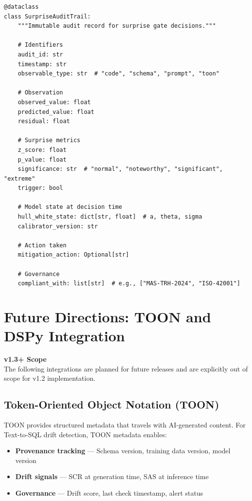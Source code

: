 \begin{lstlisting}[language=jsonx,caption={Surprise audit trail schema}]
@dataclass
class SurpriseAuditTrail:
    """Immutable audit record for surprise gate decisions."""
    
    # Identifiers
    audit_id: str
    timestamp: str
    observable_type: str  # "code", "schema", "prompt", "toon"
    
    # Observation
    observed_value: float
    predicted_value: float
    residual: float
    
    # Surprise metrics
    z_score: float
    p_value: float
    significance: str  # "normal", "noteworthy", "significant", "extreme"
    trigger: bool
    
    # Model state at decision time
    hull_white_state: dict[str, float]  # a, theta, sigma
    calibrator_version: str
    
    # Action taken
    mitigation_action: Optional[str]
    
    # Governance
    compliant_with: list[str]  # e.g., ["MAS-TRH-2024", "ISO-42001"]
\end{lstlisting}

\section{Future Directions: TOON and DSPy Integration}
\label{sec:tts-drift-future}

\begin{futurebox}
\textbf{v1.3+ Scope}\\
The following integrations are planned for future releases and are explicitly
out of scope for v1.2 implementation.
\end{futurebox}

\subsection{Token-Oriented Object Notation (TOON)}

TOON provides structured metadata that travels with AI-generated content.
For Text-to-SQL drift detection, TOON metadata enables:

\begin{itemize}
  \item \textbf{Provenance tracking} --- Schema version, training data version, model version
  \item \textbf{Drift signals} --- SCR at generation time, SAS at inference time
  \item \textbf{Governance} --- Drift score, last check timestamp, alert status
\end{itemize}

